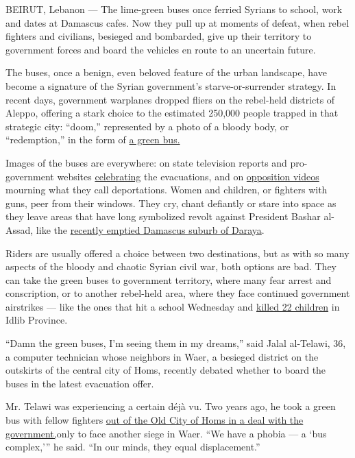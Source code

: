 BEIRUT, Lebanon --- The lime-green buses once ferried Syrians to school,
work and dates at Damascus cafes. Now they pull up at moments of defeat,
when rebel fighters and civilians, besieged and bombarded, give up their
territory to government forces and board the vehicles en route to an
uncertain future.

The buses, once a benign, even beloved feature of the urban landscape,
have become a signature of the Syrian government's starve-or-surrender
strategy. In recent days, government warplanes dropped fliers on the
rebel-held districts of Aleppo, offering a stark choice to the estimated
250,000 people trapped in that strategic city: ``doom,'' represented by
a photo of a bloody body, or ``redemption,'' in the form of
\href{https://twitter.com/CombatChris1/status/789142466624651264}{a
green bus.}

Images of the buses are everywhere: on state television reports and
pro-government websites
\href{https://www.facebookcorewwwi.onion/syrian.reporters/videos/1170350329677205/}{celebrating}
the evacuations, and on
\href{https://www.youtube.com/watch?v=4DfkLfgJy84\&feature=em-uploademail}{opposition
videos} mourning what they call deportations. Women and children, or
fighters with guns, peer from their windows. They cry, chant defiantly
or stare into space as they leave areas that have long symbolized revolt
against President Bashar al-Assad, like the
\href{http://www.nytimes3xbfgragh.onion/2016/08/27/world/middleeast/syria-daraya-falls-symbol-rebellion.html}{recently
emptied Damascus suburb of Daraya}.

Riders are usually offered a choice between two destinations, but as
with so many aspects of the bloody and chaotic Syrian civil war, both
options are bad. They can take the green buses to government territory,
where many fear arrest and conscription, or to another rebel-held area,
where they face continued government airstrikes --- like the ones that
hit a school Wednesday and
\href{http://www.nytimes3xbfgragh.onion/2016/10/27/world/middleeast/syria-school-airstrike.html}{killed
22 children} in Idlib Province.

``Damn the green buses, I'm seeing them in my dreams,'' said Jalal
al-Telawi, 36, a computer technician whose neighbors in Waer, a besieged
district on the outskirts of the central city of Homs, recently debated
whether to board the buses in the latest evacuation offer.

Mr. Telawi was experiencing a certain déjà vu. Two years ago, he took a
green bus with fellow fighters
\href{http://www.nytimes3xbfgragh.onion/2014/05/08/world/middleeast/syria.html}{out
of the Old City of Homs in a deal with the government,}only to face
another siege in Waer. ``We have a phobia --- a `bus complex,''' he
said. ``In our minds, they equal displacement.''

